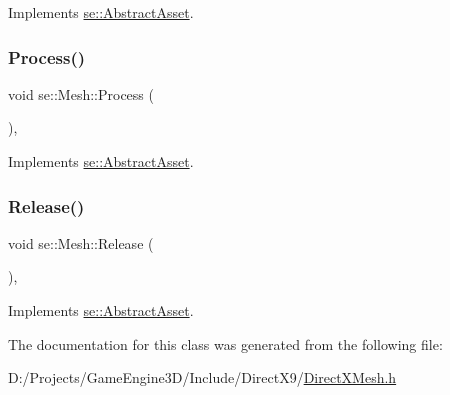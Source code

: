 Implements \mbox{\hyperlink{classse_1_1_abstract_asset_afb4dff418acf169d81b6ca5d8c1f6548}{se\+::\+Abstract\+Asset}}.

\mbox{\label{classse_1_1_mesh_a1ae42a794ee240b5d6a0dd46aa4ea60d}} 
\subsubsection{\texorpdfstring{Process()}{Process()}}
{\footnotesize\ttfamily void se\+::\+Mesh\+::\+Process (\begin{DoxyParamCaption}{ }\end{DoxyParamCaption})\hspace{0.3cm}{\ttfamily [override]}, {\ttfamily [virtual]}}



Implements \mbox{\hyperlink{classse_1_1_abstract_asset_a1f2fdf75bbeaddec16dc4778063505b7}{se\+::\+Abstract\+Asset}}.

\mbox{\label{classse_1_1_mesh_afde4ccf6665a9b6c7a8f3635dd5139e0}} 
\subsubsection{\texorpdfstring{Release()}{Release()}}
{\footnotesize\ttfamily void se\+::\+Mesh\+::\+Release (\begin{DoxyParamCaption}{ }\end{DoxyParamCaption})\hspace{0.3cm}{\ttfamily [override]}, {\ttfamily [virtual]}}



Implements \mbox{\hyperlink{classse_1_1_abstract_asset_aea97e36f647efdb07a801b6fc468388d}{se\+::\+Abstract\+Asset}}.



The documentation for this class was generated from the following file\+:\begin{DoxyCompactItemize}
\item 
D\+:/\+Projects/\+Game\+Engine3\+D/\+Include/\+Direct\+X9/\mbox{\hyperlink{_direct_x_mesh_8h}{Direct\+X\+Mesh.\+h}}\end{DoxyCompactItemize}
